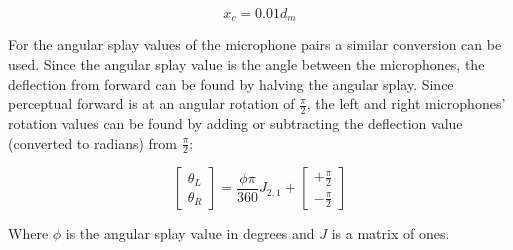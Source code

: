\begin{equation}
	x_c = 0.01d_m
\end{equation}

For the angular splay values of the microphone pairs a similar conversion can be used. Since the angular splay value is the angle between the microphones, the deflection from forward can be found by halving the angular splay. Since perceptual forward is at an angular rotation of $\frac{\pi}{2}$,  the left and right microphones' rotation values can be found by adding or subtracting the deflection value (converted to radians) from $\frac{\pi}{2}$:

\begin{equation}
	\begin{bmatrix} \theta_L \\ \theta_R \end{bmatrix} = \frac{\phi\pi}{360}J_{2,1} + \begin{bmatrix} +\frac{\pi}{2} \\ -\frac{\pi}{2} \end{bmatrix}
\end{equation}

Where $\phi$ is the angular splay value in degrees and $J$ is a matrix of ones.
